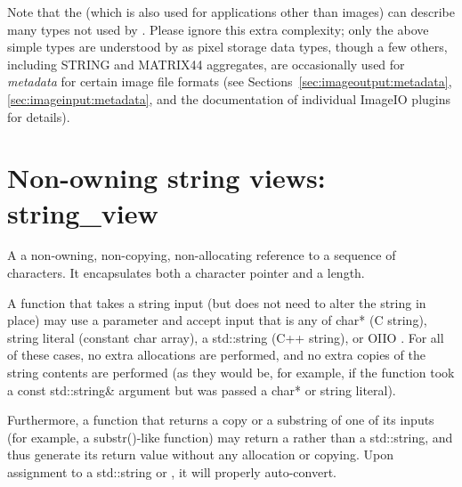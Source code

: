 Note that the \TypeDesc (which is also used for applications other
than images) can describe many types not used by
\product.  Please ignore this extra complexity; only the above simple types are understood by
\product as pixel storage data types, though a few others, including
{\cf STRING} and {\cf MATRIX44} aggregates, are occasionally used for
\emph{metadata} for certain image file formats (see
Sections~\ref{sec:imageoutput:metadata}, \ref{sec:imageinput:metadata},
and the documentation of individual ImageIO plugins for details).


\newpage

\section{Non-owning string views: {\cf string_view}}
\label{sec:stringview}

A \stringview a non-owning, non-copying, non-allocating reference to a
sequence of characters.  It encapsulates both a character pointer and a
length.

A function that takes a string input (but does not need to alter the string
in place) may use a \stringview parameter and accept input that is any of
{\cf char*} (C string), string literal (constant char array), a {\cf
std::string} (C++ string), or OIIO \ustring.  For all of these cases, no
extra allocations are performed, and no extra copies of the string  contents
are performed (as they would be, for example, if the function took a const
{\cf std::string\&} argument but was passed a {\cf char*} or string
literal).

Furthermore, a function that returns a copy or a substring of one of its
inputs (for example, a {\cf substr()}-like function) may return a \stringview
rather than a {\cf std::string}, and thus generate its return value without
any allocation or copying. Upon assignment to a {\cf std::string} or \ustring,
it will properly auto-convert.


